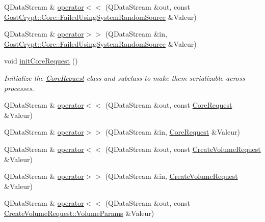 \begin{DoxyCompactItemize}
\item 
Q\+Data\+Stream \& \hyperlink{namespace_gost_crypt_1_1_core_a6b4cec660f52030cd478be0f0e738cbe}{operator$<$$<$} (Q\+Data\+Stream \&out, const \hyperlink{class_gost_crypt_1_1_core_1_1_failed_using_system_random_source}{Gost\+Crypt\+::\+Core\+::\+Failed\+Using\+System\+Random\+Source} \&Valeur)
\item 
Q\+Data\+Stream \& \hyperlink{namespace_gost_crypt_1_1_core_a86ad97819ccee7a7033f3b69fd47ae74}{operator$>$$>$} (Q\+Data\+Stream \&in, \hyperlink{class_gost_crypt_1_1_core_1_1_failed_using_system_random_source}{Gost\+Crypt\+::\+Core\+::\+Failed\+Using\+System\+Random\+Source} \&Valeur)
\item 
void \hyperlink{namespace_gost_crypt_1_1_core_a13d7cc8bb97825d89645dbfec1894b0d}{init\+Core\+Request} ()
\begin{DoxyCompactList}\small\item\em Initialize the \hyperlink{struct_gost_crypt_1_1_core_1_1_core_request}{Core\+Request} class and subclass to make them serializable across processes. \end{DoxyCompactList}\item 
Q\+Data\+Stream \& \hyperlink{namespace_gost_crypt_1_1_core_a5e3f5acf096e3b1a93c849a1b1d74919}{operator$<$$<$} (Q\+Data\+Stream \&out, const \hyperlink{struct_gost_crypt_1_1_core_1_1_core_request}{Core\+Request} \&Valeur)
\item 
Q\+Data\+Stream \& \hyperlink{namespace_gost_crypt_1_1_core_aac2d5f84e6391bfc526e3350db4744dd}{operator$>$$>$} (Q\+Data\+Stream \&in, \hyperlink{struct_gost_crypt_1_1_core_1_1_core_request}{Core\+Request} \&Valeur)
\item 
Q\+Data\+Stream \& \hyperlink{namespace_gost_crypt_1_1_core_a5850fa0f8bc50e54af40c73552ab15f1}{operator$<$$<$} (Q\+Data\+Stream \&out, const \hyperlink{struct_gost_crypt_1_1_core_1_1_create_volume_request}{Create\+Volume\+Request} \&Valeur)
\item 
Q\+Data\+Stream \& \hyperlink{namespace_gost_crypt_1_1_core_a2dd5631efd31de4df2886becbdacc4cb}{operator$>$$>$} (Q\+Data\+Stream \&in, \hyperlink{struct_gost_crypt_1_1_core_1_1_create_volume_request}{Create\+Volume\+Request} \&Valeur)
\item 
Q\+Data\+Stream \& \hyperlink{namespace_gost_crypt_1_1_core_adf8e3302a7b82cfd6cb07ab1969252a5}{operator$<$$<$} (Q\+Data\+Stream \&out, const \hyperlink{struct_gost_crypt_1_1_core_1_1_create_volume_request_1_1_volume_params}{Create\+Volume\+Request\+::\+Volume\+Params} \&Valeur)
\item 

\end{DoxyCompactItemize}
